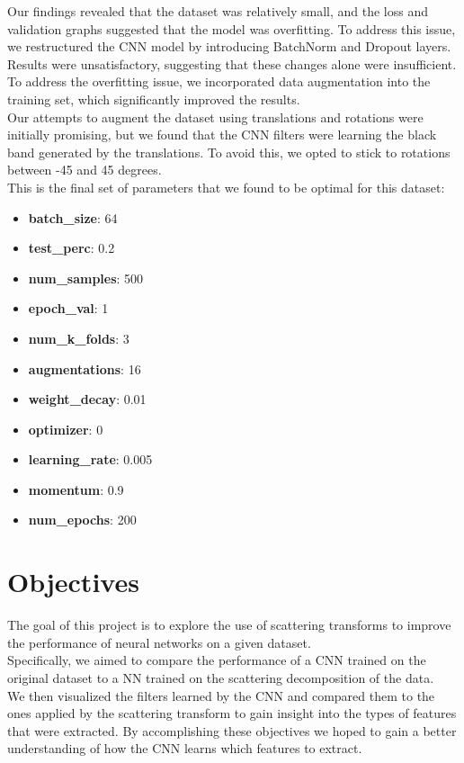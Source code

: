 \documentclass{report}
\begin{document}
Our findings revealed that the dataset was relatively small, and the loss and validation
graphs suggested that the model was overfitting. To address this issue, we restructured the
CNN model by introducing BatchNorm and Dropout layers. Results were unsatisfactory, suggesting that these changes alone were insufficient.
To address the overfitting issue, we incorporated data augmentation into the training set,
which significantly improved the results. \\
Our attempts to augment the dataset using translations and rotations were initially promising,
but we found that the CNN filters were learning the black band generated by the translations.
To avoid this, we opted to stick to rotations between -45 and 45 degrees.\\
This is the final set of parameters that we found to be optimal for this dataset:
\begin{itemize}
  \item \textbf{batch\_size}: 64
  \item \textbf{test\_perc}: 0.2
  \item \textbf{num\_samples}: 500
  \item \textbf{epoch\_val}: 1
  \item \textbf{num\_k\_folds}: 3
  \item \textbf{augmentations}: 16
  \item \textbf{weight\_decay}: 0.01
  \item \textbf{optimizer}: 0
  \item \textbf{learning\_rate}: 0.005
  \item \textbf{momentum}: 0.9 
  \item \textbf{num\_epochs}: 200
\end{itemize}


\chapter{Objectives}
The goal of this project is to explore the use of scattering transforms to improve the performance of neural networks on a given dataset.\\
Specifically, we aimed to compare the performance of a CNN trained on the original dataset to a NN trained on the scattering decomposition of the data.\\

We then visualized the filters learned by the CNN and compared them to the ones applied by the scattering transform to gain insight into the types of features that were extracted.
By accomplishing these objectives we hoped to gain a better understanding of how the CNN learns which features to extract.
\end{document}
